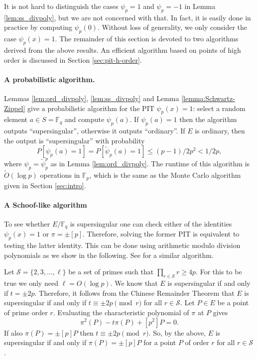 \documentclass[11pt]{article}
\theoremstyle{plain}
\theoremstyle{definition}
\newcommand{\tildO}{\tilde{O}}
\def\F{\ensuremath{\mathbb{F}}}
\begin{document}
It is not hard to distinguish the cases $\psi_p = 1$ and $\psi_p = -1$ in Lemma 
\ref{lem:ss_divpoly}, but we are not concerned with that. In fact, it is easily done in practice 
by computing $\psi_p(0)$. Without loss of generality, we only consider the case $\psi_p(x) = 1$. 
The remainder of this section is devoted to two algorithms derived from the above results. An 
efficient algorithm based on points of high order is discussed in Section \ref{sec:pit-h-order}.

\paragraph{A probabilistic algorithm.}
Lemmas \ref{lem:ord_divpoly}, \ref{lem:ss_divpoly} and Lemma \ref{lemma:Schwartz-Zippel} give a 
probabilistic algorithm for the PIT $\psi_p(x) = 1$: select a random element $a \in S = \F_q$ and 
compute $\psi_p(a)$. If $\psi_p(a) = 1$ then the algorithm outputs ``supersingular'', otherwise it 
outputs ``ordinary''. If $E$ is ordinary, then the output is ``supersingular'' with probability 
\[ P[\psi_p(a) = 1] = P[\tilde{\psi}_p(a) = 1] \le (p - 1) / 2p^2 < 1 / 2p, \] 
where $\psi_p = \tilde{\psi}_p^p$ as in Lemma \ref{lem:ord_divpoly}. The runtime of this algorithm 
is $\tildO(\log p)$ operations in $\F_p$, which is the same as the Monte Carlo algorithm given in 
Section \ref{sec:intro}.

\paragraph{A Schoof-like algorithm}
To see whether $E/\F_q$ is supersingular one can check either of the identities $\psi_p(x) = 1$ or 
$\pi = \pm [p]$. Therefore, solving the former PIT is equivalent to testing the latter identity. 
This can be done using arithmetic modulo division polynomials as we show in the following. See 
\cite[Section 2.2]{sutherland2012} for a similar algorithm.

Let $\mathcal{S} = \{2, 3, \dots, \ell\}$ be a set of primes such that $\prod_{r \in \mathcal{S}} r 
\ge 4p$. For this to be true we only need $\ell = O(\log p)$. We know that $E$ is supersingular if 
and only if $t = \pm 2p$. Therefore, it follows from the Chinese Remainder Theorem that $E$ is 
supersingular if and only if $t \equiv \pm 2p \pmod{r}$ for all $r \in \mathcal{S}$. Let $P \in E$ 
be a point of prime order $r$. Evaluating the characteristic polynomial of $\pi$ at $P$ gives
\[ \pi^2(P) - t\pi(P) + [p^2]P = 0. \]
If also $\pi(P) = \pm [p]P$ then $t \equiv \pm 2p \pmod{r}$. So, by the above, $E$ is supersingular 
if and only if $\pi(P) = \pm [p]P$ for a point $P$ of order $r$ for all $r \in \mathcal{S}$.
\end{document}
